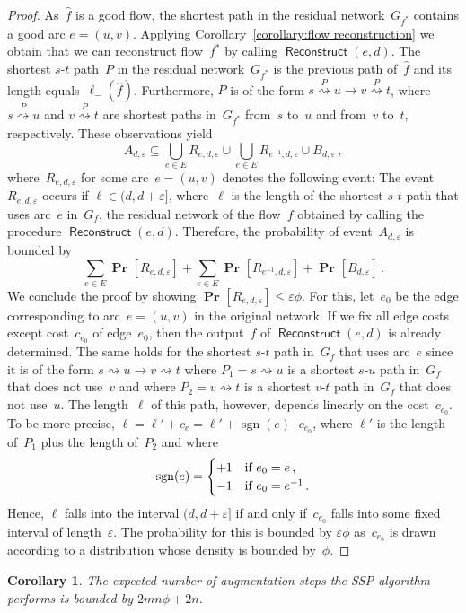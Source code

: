 \documentclass[11pt]{article}
\newtheorem{corollary}[theorem]{Corollary}
\newcommand{\e}{\varepsilon}
\renewcommand{\sp}{\ell}
\newcommand{\DOT}{\,.}
\newcommand{\COMMA}{\,,}
\newcommand{\tIF}{\text{if}}
\DeclareMathOperator{\Reconstruct}{\mathsf{Reconstruct}}
\DeclareMathOperator{\sgn}{sgn}
\renewcommand{\Pr}[2][]{\operatorname{\textbf{Pr}}_{#1}\left[#2\right]}
\newcommand{\PATH}[1][]{\stackrel{#1}{\rightsquigarrow}}
\newcommand{\spm}[1][]{\sp^{#1}_{-}}
\begin{document}
\begin{proof}
As~$\hat{f}$ is a good flow, the shortest path in the residual network~$G_{f^*}$ contains a good arc $e = (u, v)$. Applying Corollary~\ref{corollary:flow reconstruction} we obtain that we can reconstruct flow~$f^*$ by calling $\Reconstruct(e, d)$. The shortest $s$-$t$ path~$P$ in the residual network~$G_{f^*}$ is the previous path of~$\hat{f}$ and its length equals~$\spm(\hat{f})$. Furthermore, $P$ is of the form $s \PATH[P] u \to v \PATH[P] t$, where $s \PATH[P] u$ and $v \PATH[P] t$ are shortest paths in~$G_{f^*}$ from~$s$ to~$u$ and from~$v$ to~$t$, respectively. These observations yield
\[
  A_{d, \e} \subseteq \bigcup_{e \in E} R_{e, d, \e} \cup \bigcup_{e \in E} R_{e^{-1}, d, \e} \cup B_{d, \e} \COMMA
\]
where~$R_{e, d, \e}$ for some arc~$e = (u, v)$ denotes the following event: The event~$R_{e, d, \e}$ occurs if $\ell \in (d, d+\e]$, where~$\ell$ is the length of the shortest $s$-$t$ path that uses arc~$e$ in~$G_f$, the residual network of the flow~$f$ obtained by calling the procedure $\Reconstruct(e, d)$. Therefore, the probability of event~$A_{d, \e}$ is bounded by
\[
  \sum_{e \in E} \Pr{R_{e, d, \e}} + \sum_{e \in E} \Pr{R_{e^{-1}, d, \e}} + \Pr{B_{d, \e}} \DOT
\]
We conclude the proof by showing $\Pr{R_{e, d, \e}} \leq \e \phi$. For this, let~$e_0$ be the edge corresponding to arc~$e = (u, v)$ in the original network. If we fix all edge costs except cost~$c_{e_0}$ of edge~$e_0$, then the output~$f$ of $\Reconstruct(e, d)$ is already determined. The same holds for the shortest $s$-$t$ path in~$G_f$ that uses arc~$e$ since it is of the form $s \PATH u \to v \PATH t$ where $P_1 = s \PATH u$ is a shortest $s$-$u$ path in~$G_f$ that does not use~$v$ and where $P_2 = v \PATH t$ is a shortest $v$-$t$ path in~$G_f$ that does not use~$u$. The length~$\ell$ of this path, however, depends linearly on the cost~$c_{e_0}$. To be more precise, $\ell = \ell' + c_e = \ell' + \sgn(e) \cdot c_{e_0}$, where $\ell'$ is the length of~$P_1$ plus the length of~$P_2$ and where
\[ 
\sgn(e) = \begin{cases}
    +1 & \tIF\ e_0 = e \COMMA \cr
    -1 & \tIF\ e_0 = e^{-1} \DOT
  \end{cases}
\]
Hence, $\ell$ falls into the interval $(d, d+\e]$ if and only if~$c_{e_0}$ falls into some fixed interval of length~$\e$. The probability for this is bounded by $\e \phi$ as~$c_{e_0}$ is drawn according to a distribution whose density is bounded by~$\phi$. \end{proof}

\begin{corollary}
\label{corollary:expected number of SSP steps}
The expected number of augmentation steps the SSP algorithm performs is bounded by $2mn\phi + 2n$.
\end{corollary}
\end{document}
